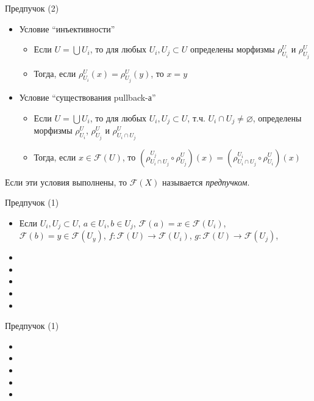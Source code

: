 \documentclass{beamer}
\begin{document}
\begin{frame}{Предпучок (2)}
\begin{itemize}
	\item Условие ``инъективности''
		\bigskip
		\begin{itemize}
			\item Если $U = \bigcup U_i$, то для любых $U_i, U_j \subset U$ определены морфизмы $\rho^U_{U_i}$ и $\rho^U_{U_j}$
			\medskip
			\item Тогда, если $\rho^U_{U_i}(x) = \rho^U_{U_j}(y)$, то $x = y$
		\end{itemize}
	\bigskip
	\item Условие ``существования pullback-а''
		\bigskip
		\begin{itemize}
			\item Если $U = \bigcup U_i$, то для любых $U_i, U_j \subset U$, т.ч. $U_i \cap U_j \neq \varnothing$, определены морфизмы $\rho^U_{U_i}$, $\rho^U_{U_j}$ и $\rho^U_{U_i \cap U_j}$
			\medskip
			\item Тогда, если $x \in \mathcal{F}(U)$, то $(\rho^{U_j}_{U_i \cap U_j} \circ \rho^U_{U_j})(x) = (\rho^{U_i}_{U_i \cap U_j} \circ \rho^U_{U_i})(x)$
		\end{itemize}
\end{itemize}
\bigskip
Если эти условия выполнены, то $\mathcal{F}(X)$ называется \textit{предпучком}.
\end{frame}

\begin{frame}{Предпучок (1)}
\begin{itemize}
	\item Если $U_i, U_j \subset U$, $a \in U_i, b \in U_j$, $\mathcal{F}(a) = x \in \mathcal{F}(U_i)$, $\mathcal{F}(b) = y \in \mathcal{F}(U_y)$, $f : \mathcal{F}(U) \to \mathcal{F}(U_i)$, $g : \mathcal{F}(U) \to \mathcal{F}(U_j)$, 
	\item
	\item
	\item
	\item
	\item
\end{itemize}
\end{frame}

\begin{frame}{Предпучок (1)}
\begin{itemize}
	\item
	\item
	\item
	\item
	\item
\end{itemize}
\end{frame}
\end{document}
